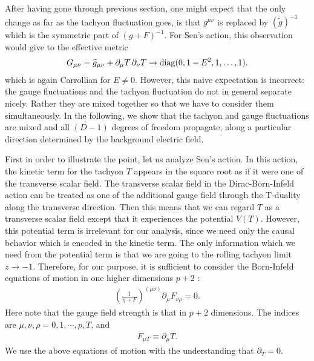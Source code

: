 \documentclass[a4paper,12pt]{article}
\newcommand{\p}{\partial}
\begin{document}
After having gone through previous section, one might expect that the
only change as far as the tachyon fluctuation goes,  is that 
$g^{\mu\nu}$ is replaced by $(\widetilde g)^{-1}$ which is the
symmetric part of $(g+F)^{-1}$. For Sen's action, this observation 
would give
to the effective metric
\begin{eqnarray}
G_{\mu \nu} = \widetilde g_{\mu \nu}  + \partial _\mu T 
\thinspace \partial_\nu T \rightarrow 
{\rm diag } (0,1-E^2,1, \dots, 1 ).  
\end{eqnarray}
which is again Carrollian for $E\neq 0$.
However, this naive expectation is incorrect: the gauge fluctuations and 
the tachyon fluctuation do not in general separate nicely. Rather they
are mixed together so that we have to consider them simultaneously.
In the following, we show that the tachyon and gauge fluctuations are
mixed and all $(D-1)$ degrees of freedom propagate, along a
particular direction determined by the background electric field.



First in order to 
illustrate the point, let us analyze Sen's action. 
In this action, the kinetic term for  the tachyon $T$ appears in the
square root as if it were one of the transverse scalar field. The
transverse scalar field in the Dirac-Born-Infeld action can be treated
as one of the additional gauge field \cite{BIparticle} 
through the T-duality along the
transverse direction. Then this means that we can regard $T$ as a
transverse scalar field except that it experiences the 
potential $V(T)$. However, this potential term is irrelevant for our
analysis, since we need only the causal behavior which is encoded in the
kinetic term. The only information which we need from the potential term
is that we are going to the rolling tachyon limit $z\rightarrow -1$. 
Therefore, for our purpose, it is sufficient to consider the
Born-Infeld equations of motion in one higher dimensions $p+2$ :
\begin{eqnarray}
\left(
\frac{1}{\eta + F}
\right)^{(\mu\nu)} \p_\mu F_{\nu\rho}=0.
\label{dbieq}
\end{eqnarray}
Here note that the gauge field strength is that in $p+2$ dimensions. The
indices are $\mu, \nu,\rho = 0,1,\cdots,p,T$, and 
\begin{eqnarray}
 F_{\mu T} \equiv \p_\mu T.
\end{eqnarray}
We use the above equations of motion with the understanding that 
$\p_T=0$. 
\end{document}
